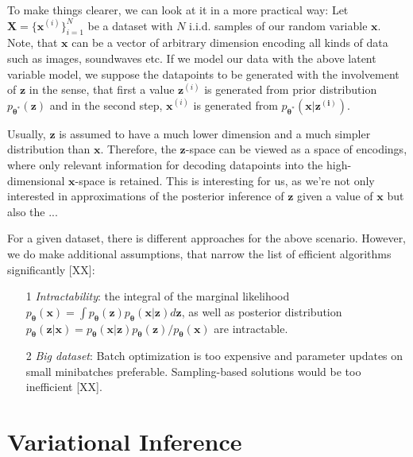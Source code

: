 \documentclass[12pt]{report}
\theoremstyle{definition}
\begin{document}
To make things clearer, we can  look at it in a more practical way: Let $\mathbf{X} = \{ \mathbf{x}^{(i)}\}_{i=1}^N$ be a dataset with $N$ i.i.d. samples of our random variable $\mathbf{x}$. Note, that $\mathbf{x}$ can be a vector of arbitrary dimension encoding all kinds of data such as images, soundwaves etc. If we model our data with the above latent variable model, we suppose the datapoints to be generated with the involvement of $\mathbf{z}$ in the sense, that first a value $\mathbf{z}^{(i)}$ is generated from prior distribution $p_{\mathbf{\theta^*}}(\mathbf{z})$ and in the second step, $\mathbf{x}^{(i)}$ is generated from $p_{\mathbf{\theta^*}}(\mathbf{x}|\mathbf{z^{(i)}})$.

Usually, $\mathbf{z}$ is assumed to have a much lower dimension and a much simpler distribution than $\mathbf{x}$. Therefore, the $\mathbf{z}$-space can be viewed as a space of encodings, where only relevant information for decoding datapoints into the high-dimensional $\mathbf{x}$-space is retained. This is interesting for us, as we're not only interested in approximations of the posterior inference of $\mathbf{z}$ given a value of $\mathbf{x}$ but also the ... %

For a given dataset, there is different approaches for the above scenario. However, we do make additional assumptions, that narrow the list of efficient algorithms significantly [XX]:

\begin{itemize}
	\item[1] \emph{Intractability}: the integral of the marginal likelihood $p_{\mathbf{\theta}}(\mathbf{x}) = \int p_{\mathbf{\theta}}(\mathbf{z}) p_{\mathbf{\theta}}(\mathbf{x}|\mathbf{z}) d \mathbf{z}$, as well as posterior distribution $p_{\mathbf{\theta}}(\mathbf{z}|\mathbf{x}) = p_{\mathbf{\theta}}(\mathbf{x}|\mathbf{z}) p_{\mathbf{\theta}}(\mathbf{z}) / p_{\mathbf{\theta}}(\mathbf{x})$ are intractable.
	\item[2] \emph{Big dataset}: Batch optimization is too expensive and parameter updates on small minibatches preferable. Sampling-based solutions would be too inefficient [XX].
\end{itemize}

\section{Variational Inference}
\end{document}
